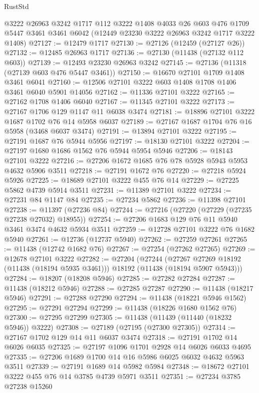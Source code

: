 \begin{lexlean}{RustStd}
\begin{coremodule}
    @3222
    @26963
    @3242
    @1717
    @112
    @3222
    @1408
    @4033
    @26
    @603
    @476
    @1709
    @5447
    @3461
    @3461
    @6042
    (@12449 @23230 @3222 @26963 @3242 @1717 @3222 @1408)
@27127 := @12479 @1717
@27130 := @27126 (@12459 (@27127 @26))
@27132 := @12485 @26963 @1717
@27136 := @27130 (@11438 (@27132 @112 @603))
@27139 := @12493 @23230 @26963 @3242
@27145 := @27136 (@11318 (@27139 @603 @476 @5447 @3461))
@27150 := @16670 @27101 @1709 @1408 @3461 @6041
@27160 := @12506 @27101 @3222 @603 @1408 @1708 @1406 @3461 @6040 @5901 @14056
@27162 := @11336 @27101 @3222
@27165 := @27162 @1708 @1406 @6040
@27167 := @11345 @27101 @3222
@27173 := @27167 @1706 @129 @1147 @11 @6038 @3474
@27181 := @18896 @27101 @3222 @1687 @1702 @76 @14 @5958 @6037
@27189 := @27167 @1687 @1704 @76 @16 @5958 (@3468 @6037 @3474)
@27191 := @13894 @27101 @3222
@27195 := @27191 @1687 @76 @5944 @5956
@27197 := @18130 @27101 @3222
@27204 := @27197 @1680 @1686 @1562 @76 @5944 @5954 @5946
@27206 := @18143 @27101 @3222
@27216 := @27206 @1672 @1685 @76 @78 @5928 @5943 @5953 @4632 @5906 @3511
@27218 := @27191 @1672 @76
@27220 := @27218 @5924 @5926
@27225 := @18689 @27101 @3222 @455 @76 @14
@27229 := @27225 @5862 @4739 @5914 @3511
@27231 := @11389 @27101 @3222
@27234 := @27231 @84 @1147 @84
@27235 := @27234 @5862
@27236 := @11398 @27101
@27238 := @11397 (@27236 @84)
@27244 := @27216 (@27220 (@27229 (@27235 @27238 @27032) @18955))
@27254 := @27206 @1683 @129 @76 @11 @5940 @3461 @3474 @4632 @5934 @3511
@27259 := @12728 @27101 @3222 @76 @1682 @5940
@27261 := @12736 (@12737 @5940)
@27262 := @27259 @27261
@27265 := @11438 (@12742 @1682 @76)
@27267 := @27254 (@27262 @27265)
@27269 := @12678 @27101 @3222
@27282 := @27204
    (@27244
      (@27267 @27269 @18192 (@11438 (@18194 @5935 @3461)))
      @18192
      (@11438 (@18194 @5907 @5943)))
@27284 := @18207 (@18208 @5946)
@27285 := @27282 @27284
@27287 := @11438 (@18212 @5946)
@27288 := @27285 @27287
@27290 := @11438 (@18217 @5946)
@27291 := @27288 @27290
@27294 := @11438 (@18221 @5946 @1562)
@27295 := @27291 @27294
@27299 := @11438 (@18226 @1680 @1562 @76)
@27300 := @27295 @27299
@27305 := @11438 (@11439 (@11440 (@18232 @5946)) @3222)
@27308 := @27189 (@27195 (@27300 @27305))
@27314 := @27167 @1702 @129 @14 @11 @6037 @3474
@27318 := @27191 @1702 @14 @6026 @6035
@27325 := @27197 @1096 @1701 @2928 @14 @6026 @6033 @4695
@27335 := @27206 @1689 @1700 @14 @16 @5986 @6025 @6032 @4632 @5963 @3511
@27339 := @27191 @1689 @14 @5982 @5984
@27348 := @18672 @27101 @3222 @455 @76 @14 @3785 @4739 @5971 @3511
@27351 := @27234 @3785 @27238 @15260

\end{coremodule}
\end{lexlean}
